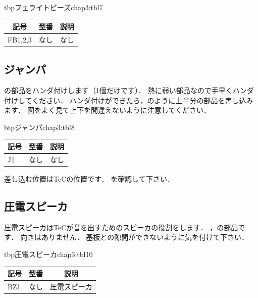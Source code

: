 \begin{mytable}{tbp}{フェライトビーズ}{chap3:tbl7}
{\small\begin{tabular}{l|l|l}
\hline
\hline
\multicolumn{1}{c|}{記号} &
\multicolumn{1}{c|}{型番} &
\multicolumn{1}{c}{説明} \\
\hline
FB1,2,3 & なし & なし \\
\end{tabular}}
\end{mytable}


\subsection{ジャンパ}
の部品をハンダ付けします（1個だけです）．
熱に弱い部品なので手早くハンダ付けしてください．
ハンダ付けができたら，のように上半分の部品を差し込みます．
図をよく見て上下を間違えないように注意してください．

\begin{mytable}{btp}{ジャンパ}{chap3:tbl8}
{\small\begin{tabular}{l|l|l}
\hline
\hline
\multicolumn{1}{c|}{記号} &
\multicolumn{1}{c|}{型番} &
\multicolumn{1}{c}{説明} \\
\hline
J1 & なし &  なし \\
\end{tabular}}
\end{mytable}

差し込む位置はTeCの位置です．
を確認して下さい．


\subsection{圧電スピーカ}
圧電スピーカはTeCが音を出すためのスピーカの役割をします．
，の部品です．
向きはありません．
基板との隙間ができないように気を付けて下さい．

\begin{mytable}{tbp}{圧電スピーカ}{chap3:tbl10}
{\small\begin{tabular}{l|l|l}
\hline
\hline
\multicolumn{1}{c|}{記号} &
\multicolumn{1}{c|}{型番} &
\multicolumn{1}{c}{説明} \\
\hline
BZ1 & なし & 圧電スピーカ \\
\end{tabular}}
\end{mytable}

